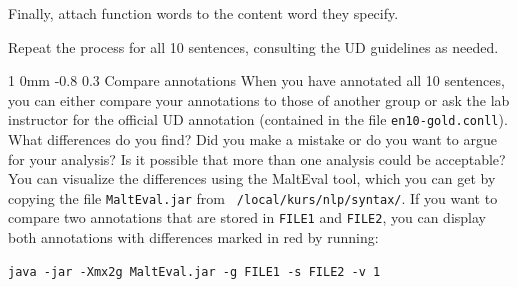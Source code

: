 \documentclass[10.9pt]{article}
\makeatletter
\newcommand{\newsec}[2]{\section{#1}\label{sec:#2}\noindent}
\renewcommand{\section}{\@startsection
{section}%
{1}%
{0mm}%
{-0.8\baselineskip}%
{0.3\baselineskip}%
{\bfseries\large}}%
\makeatother
\begin{document}
Finally, attach function words to the content word they specify.
\begin{center}
\end{center}
Repeat the process for all 10 sentences, consulting the UD guidelines as needed.

\newsec{Compare annotations}{compare}%
When you have annotated all 10 sentences, you can either compare your annotations to those of another group or ask the lab instructor for the official UD annotation
(contained in the file {\tt en10-gold.conll}). What differences do you find? Did you make a mistake or do you want to argue for your analysis? Is it possible that more than
one analysis could be acceptable? You can visualize the differences using the MaltEval tool, which you can get by copying the file {\tt MaltEval.jar} from {\tt
  /local/kurs/nlp/syntax/}. If you want to compare two annotations that are stored in {\tt FILE1} and {\tt FILE2}, you can display both annotations with differences marked in red
  by running:
\begin{small}
\begin{verbatim}
java -jar -Xmx2g MaltEval.jar -g FILE1 -s FILE2 -v 1
\end{verbatim}
\end{small}
\end{document}
